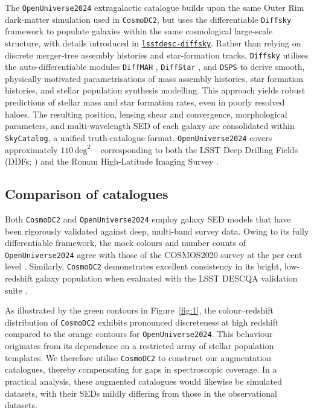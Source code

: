 The \texttt{OpenUniverse2024} extragalactic catalogue \citep{2025MNRAS.544.3799O} builds upon the same Outer Rim dark‐matter simulation used in \texttt{CosmoDC2}, but uses the differentiable \texttt{Diffsky} framework to populate galaxies within the same cosmological large‐scale structure, with details introduced in \href{https://lsstdesc-diffsky.readthedocs.io/en/latest/index.html}{\texttt{lsstdesc-diffsky}}. Rather than relying on discrete merger‐tree assembly histories and star‐formation tracks, \texttt{Diffsky} utilises the auto‐differentiable modules \texttt{DiffMAH} \citep{2021OJAp....4E...7H}, \texttt{DiffStar} \citep{2023MNRAS.518..562A}, and \texttt{DSPS} \citep{2023MNRAS.521.1741H} to derive smooth, physically motivated parametrisations of mass assembly histories, star formation histories, and stellar population synthesis modelling. This approach yields robust predictions of stellar mass and star formation rates, even in poorly resolved haloes. The resulting position, lensing shear and convergence, morphological parameters, and multi‐wavelength SED of each galaxy are consolidated within \texttt{SkyCatalog}, a unified truth‐catalogue format. \texttt{OpenUniverse2024} covers approximately \(110\,\mathrm{deg}^2\) -- corresponding to both the LSST Deep Drilling Fields (DDFs; \citealp{2024ApJS..275...21G}) and the Roman High-Latitude Imaging Survey \citep{2019arXiv190205569A}.

\subsection{Comparison of catalogues}

Both \texttt{CosmoDC2} and \texttt{OpenUniverse2024} employ galaxy SED models that have been rigorously validated against deep, multi-band survey data. Owing to its fully differentiable framework, the mock colours and number counts of \texttt{OpenUniverse2024} agree with those of the COSMOS2020 survey at the per cent level \citep{2022ApJS..258...11W, 2022A&A...664A..61S}. Similarly, \texttt{CosmoDC2} demonstrates excellent consistency in its bright, low-redshift galaxy population when evaluated with the LSST DESCQA validation suite \citep{2018ApJS..234...36M, 2019ApJS..245...26K, 2021ApJS..253...31L}.

As illustrated by the green contours in Figure~\ref{fig:1}, the colour–redshift distribution of \texttt{CosmoDC2} exhibits pronounced discreteness at high redshift compared to the orange contours for \texttt{OpenUniverse2024}. This behaviour originates from its dependence on a restricted array of stellar population templates. We therefore utilise \texttt{CosmoDC2} to construct our augmentation catalogues, thereby compensating for gaps in spectroscopic coverage. In a practical analysis, these augmented catalogues would likewise be simulated datasets, with their SEDs mildly differing from those in the observational datasets.

